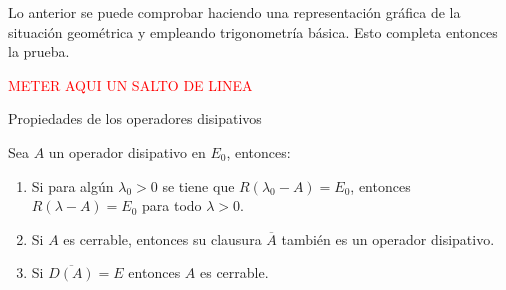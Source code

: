 Lo anterior se puede comprobar haciendo una representación gráfica de la situación geométrica y empleando trigonometría básica. Esto completa entonces la prueba.

\textcolor{red}{METER AQUI UN SALTO DE LINEA}\\

\begin{Teorema}{Propiedades de los operadores disipativos}
    \label{ch:semigrupos:th:PropsOpDisipativos}

    Sea $A$ un operador disipativo en $E_0$, entonces:

    \begin{enumerate}
        \item Si para algún $\lambda_0 > 0$ se tiene que $R(\lambda_0 - A) = E_0$, entonces $R(\lambda - A) = E_0$ para todo $\lambda > 0$.

        \item Si $A$ es cerrable\footnotemark, entonces su clausura $\overline{A}$ también es un operador disipativo.

        \item Si $\overline{D(A)} = E$ entonces $A$ es cerrable.
    \end{enumerate}
\end{Teorema}
